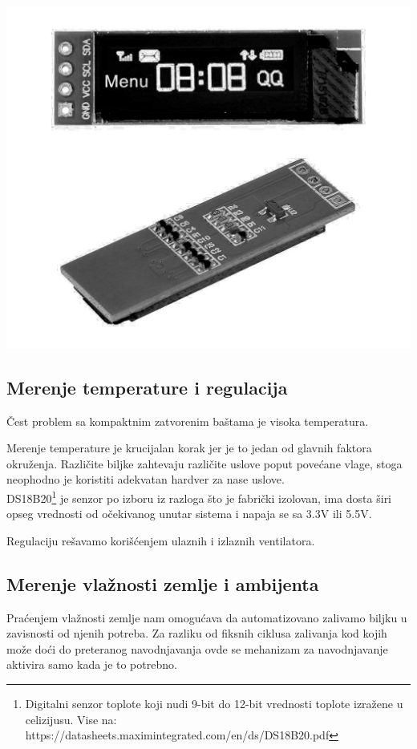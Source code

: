 \documentclass[a4paper,11pt]{book}
\begin{document}
\includegraphics[width=\textwidth]{oled.png}

\subsection{Merenje temperature i regulacija}

Čest problem sa kompaktnim zatvorenim baštama je visoka temperatura.

Merenje temperature je krucijalan korak jer je to jedan od glavnih faktora okruženja. Različite biljke zahtevaju različite uslove poput povećane vlage, stoga neophodno je koristiti adekvatan hardver za nase uslove.\\ 

\noindent DS18B20\footnote{Digitalni senzor toplote koji nudi 9-bit do 12-bit vrednosti toplote izražene u celizijusu. Vise na: https://datasheets.maximintegrated.com/en/ds/DS18B20.pdf} je senzor po izboru iz razloga što je fabrički izolovan, ima dosta širi opseg vrednosti od očekivanog unutar sistema i napaja se sa 3.3V ili 5.5V.

Regulaciju rešavamo korišćenjem ulaznih i izlaznih ventilatora.

\subsection{Merenje vlažnosti zemlje i ambijenta}
Praćenjem vlažnosti zemlje nam omogućava da automatizovano zalivamo biljku u zavisnosti od njenih potreba. Za razliku od fiksnih ciklusa zalivanja kod kojih može doći do preteranog navodnjavanja ovde se mehanizam za navodnjavanje aktivira samo kada je to potrebno.
\end{document}
